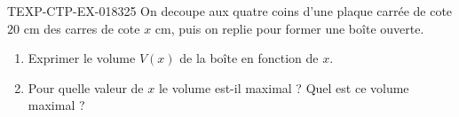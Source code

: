 \begin{exercice}{TEXP-CTP-EX-018}{3}{25}
On decoupe aux quatre coins d'une plaque carrée de cote $20$ cm des carres de cote $x$ cm, puis on replie pour former une boîte ouverte.
\begin{enumerate}
  \item Exprimer le volume $V(x)$ de la boîte en fonction de $x$.
  \item Pour quelle valeur de $x$ le volume est-il maximal ? Quel est ce volume maximal ?
\end{enumerate}

\end{exercice}
